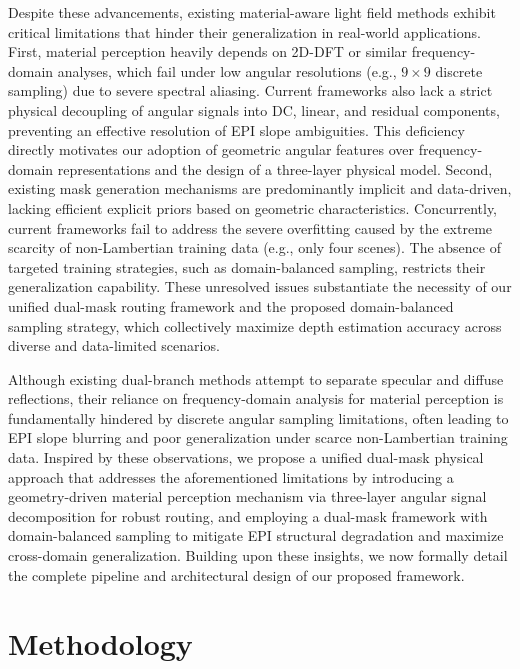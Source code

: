 \documentclass[lettersize,journal]{IEEEtran}
\begin{document}
Despite these advancements, existing material-aware light field methods exhibit critical limitations that hinder their generalization in real-world applications. First, material perception heavily depends on 2D-DFT or similar frequency-domain analyses, which fail under low angular resolutions (e.g., $9 \times 9$ discrete sampling) due to severe spectral aliasing. Current frameworks also lack a strict physical decoupling of angular signals into DC, linear, and residual components, preventing an effective resolution of EPI slope ambiguities. This deficiency directly motivates our adoption of geometric angular features over frequency-domain representations and the design of a three-layer physical model. Second, existing mask generation mechanisms are predominantly implicit and data-driven, lacking efficient explicit priors based on geometric characteristics. Concurrently, current frameworks fail to address the severe overfitting caused by the extreme scarcity of non-Lambertian training data (e.g., only four scenes). The absence of targeted training strategies, such as domain-balanced sampling, restricts their generalization capability. These unresolved issues substantiate the necessity of our unified dual-mask routing framework and the proposed domain-balanced sampling strategy, which collectively maximize depth estimation accuracy across diverse and data-limited scenarios.

Although existing dual-branch methods attempt to separate specular and diffuse reflections, their reliance on frequency-domain analysis for material perception is fundamentally hindered by discrete angular sampling limitations, often leading to EPI slope blurring and poor generalization under scarce non-Lambertian training data. Inspired by these observations, we propose a unified dual-mask physical approach that addresses the aforementioned limitations by introducing a geometry-driven material perception mechanism via three-layer angular signal decomposition for robust routing, and employing a dual-mask framework with domain-balanced sampling to mitigate EPI structural degradation and maximize cross-domain generalization. Building upon these insights, we now formally detail the complete pipeline and architectural design of our proposed framework.

\section{Methodology}
\end{document}
